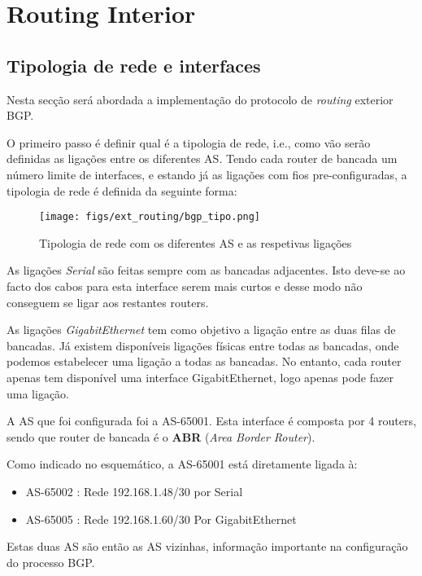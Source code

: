 \chapter{Routing Interior} \label{sec:ext_routing}

\section{Tipologia de rede e interfaces}

Nesta secção será abordada a implementação do protocolo de \textit{routing} exterior BGP.

O primeiro passo é definir qual é a tipologia de rede, i.e., como vão serão definidas as ligações entre os diferentes AS.
Tendo cada router de bancada um número limite de interfaces, e estando já as ligações com fios pre-configuradas, a tipologia de rede é definida da seguinte forma:

\begin{figure}[H]
    \centering
    \texttt{[image: figs/ext\_routing/bgp\_tipo.png]}
    \caption{Tipologia de rede com os diferentes AS e as respetivas ligações}
    \label{fig:bgp_tipo}
\end{figure}

As ligações \textit{Serial} são feitas sempre com as bancadas adjacentes.
Isto deve-se ao facto dos cabos para esta interface serem mais curtos e desse modo não conseguem se ligar aos restantes routers.

As ligações \textit{GigabitEthernet} tem como objetivo a ligação entre as duas filas de bancadas.
Já existem disponíveis ligações físicas entre todas as bancadas, onde podemos estabelecer uma ligação a todas as bancadas.
No entanto, cada router apenas tem disponível uma interface GigabitEthernet, logo apenas pode fazer uma ligação.

A AS que foi configurada foi a AS-65001.
Esta interface é composta por 4 routers, sendo que router de bancada é o \textbf{ABR} (\textit{Area Border Router}).

Como indicado no esquemático, a AS-65001 está diretamente ligada à:
\begin{itemize}
    \item AS-65002 : Rede 192.168.1.48/30 por Serial
    \item AS-65005 : Rede 192.168.1.60/30 Por GigabitEthernet
\end{itemize}

Estas duas AS são então as AS vizinhas, informação importante na configuração do processo BGP.

